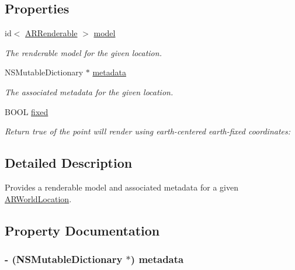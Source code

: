 \subsection*{Properties}
\begin{DoxyCompactItemize}
\item 
\hypertarget{interface_a_r_world_point_a31c4c5837e58a5d02fc59c370c9138b9}{id$<$ \hyperlink{protocol_a_r_renderable-p}{A\-R\-Renderable} $>$ \hyperlink{interface_a_r_world_point_a31c4c5837e58a5d02fc59c370c9138b9}{model}}\label{interface_a_r_world_point_a31c4c5837e58a5d02fc59c370c9138b9}

\begin{DoxyCompactList}\small\item\em The renderable model for the given location. \end{DoxyCompactList}\item 
N\-S\-Mutable\-Dictionary $\ast$ \hyperlink{interface_a_r_world_point_a25146859c4e3ab1a0bf9ba74e3fdb763}{metadata}
\begin{DoxyCompactList}\small\item\em The associated metadata for the given location. \end{DoxyCompactList}\item 
\hypertarget{interface_a_r_world_point_a298af81c33230c1a2d6f3f82e8e25f12}{B\-O\-O\-L \hyperlink{interface_a_r_world_point_a298af81c33230c1a2d6f3f82e8e25f12}{fixed}}\label{interface_a_r_world_point_a298af81c33230c1a2d6f3f82e8e25f12}

\begin{DoxyCompactList}\small\item\em Return true of the point will render using earth-\/centered earth-\/fixed coordinates\-: \end{DoxyCompactList}\end{DoxyCompactItemize}


\subsection{Detailed Description}
Provides a renderable model and associated metadata for a given \hyperlink{interface_a_r_world_location}{A\-R\-World\-Location}. 

\subsection{Property Documentation}
\hypertarget{interface_a_r_world_point_a25146859c4e3ab1a0bf9ba74e3fdb763}{
\subsubsection[{metadata}]{\setlength{\rightskip}{0pt plus 5cm}-\/ (N\-S\-Mutable\-Dictionary $\ast$) {\bf metadata}}}\label{interface_a_r_world_point_a25146859c4e3ab1a0bf9ba74e3fdb763}


